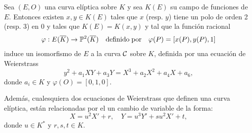 \begin{thm}\label{thm:eq-weierstrass-E}
	Sea $(E,O)$ una curva elíptica sobre $K$ y sea $K(E)$ su campo de funciones de $E$. Entonces existen $x,y\in K(E)$ tales que $x$ (resp. $y$) tiene un polo de orden 2 (resp. 3) en $0$ y tales que $K(E)=K(x,y)$ y tal que la función racional
	\[
		\varphi:E(\overline{K})\rightarrow\mathbb{P}^2(\overline{K})\quad\mathrm{definido}\;\mathrm{por}\quad \varphi(P)=[x(P),y(P),1] 
	\]
	induce un isomorfismo de $E$ a la curva $\mathcal{C}$ sobre $K$, definida por una ecuación de Weierstrass
	\begin{equation}\label{eq:weierstrass-asociada-E}
		y^2+a_1 XY+a_3Y=X^3+a_2X^2+a_4X+a_6,
	\end{equation}
	donde $a_i\in K$ y $\varphi(O)=[0,1,0]$.
	
	Además, cualesquiera dos ecuaciones de Weierstrass que definen una curva elíptica, están relacionadas por el un cambio de variable de la forma:
	\[
		X=u^2X'+r,\quad Y=u^3Y'+su^2X'+t,
	\]
	donde $u\in K^*$ y $r,s,t\in K$.
\end{thm}

